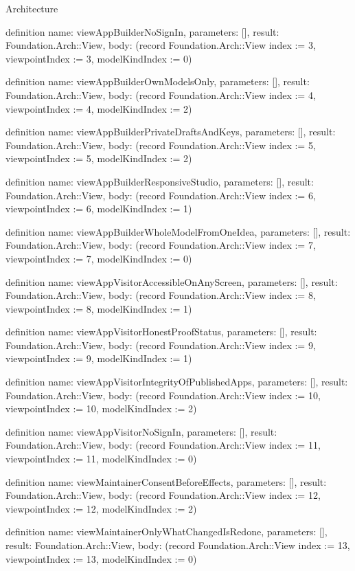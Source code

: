 \begin{lexlean}{Architecture}
\begin{semanticmodule}
definition{
  name: viewAppBuilderNoSignIn,
  parameters: [],
  result: Foundation.Arch::View,
  body: (record Foundation.Arch::View {index := 3, viewpointIndex := 3, modelKindIndex := 0})
}

definition{
  name: viewAppBuilderOwnModelsOnly,
  parameters: [],
  result: Foundation.Arch::View,
  body: (record Foundation.Arch::View {index := 4, viewpointIndex := 4, modelKindIndex := 2})
}

definition{
  name: viewAppBuilderPrivateDraftsAndKeys,
  parameters: [],
  result: Foundation.Arch::View,
  body: (record Foundation.Arch::View {index := 5, viewpointIndex := 5, modelKindIndex := 2})
}

definition{
  name: viewAppBuilderResponsiveStudio,
  parameters: [],
  result: Foundation.Arch::View,
  body: (record Foundation.Arch::View {index := 6, viewpointIndex := 6, modelKindIndex := 1})
}

definition{
  name: viewAppBuilderWholeModelFromOneIdea,
  parameters: [],
  result: Foundation.Arch::View,
  body: (record Foundation.Arch::View {index := 7, viewpointIndex := 7, modelKindIndex := 0})
}

definition{
  name: viewAppVisitorAccessibleOnAnyScreen,
  parameters: [],
  result: Foundation.Arch::View,
  body: (record Foundation.Arch::View {index := 8, viewpointIndex := 8, modelKindIndex := 1})
}

definition{
  name: viewAppVisitorHonestProofStatus,
  parameters: [],
  result: Foundation.Arch::View,
  body: (record Foundation.Arch::View {index := 9, viewpointIndex := 9, modelKindIndex := 1})
}

definition{
  name: viewAppVisitorIntegrityOfPublishedApps,
  parameters: [],
  result: Foundation.Arch::View,
  body: (record Foundation.Arch::View {index := 10, viewpointIndex := 10, modelKindIndex := 2})
}

definition{
  name: viewAppVisitorNoSignIn,
  parameters: [],
  result: Foundation.Arch::View,
  body: (record Foundation.Arch::View {index := 11, viewpointIndex := 11, modelKindIndex := 0})
}

definition{
  name: viewMaintainerConsentBeforeEffects,
  parameters: [],
  result: Foundation.Arch::View,
  body: (record Foundation.Arch::View {index := 12, viewpointIndex := 12, modelKindIndex := 2})
}

definition{
  name: viewMaintainerOnlyWhatChangedIsRedone,
  parameters: [],
  result: Foundation.Arch::View,
  body: (record Foundation.Arch::View {index := 13, viewpointIndex := 13, modelKindIndex := 0})
}


\end{semanticmodule}
\end{lexlean}
